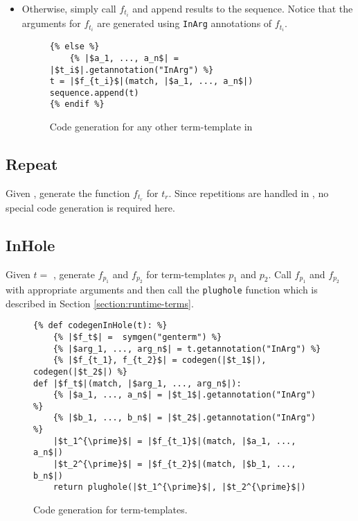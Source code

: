 \begin{itemize}
\item Otherwise, simply call $f_{t_i}$ and append results to the sequence. Notice that the arguments for $f_{t_i}$ are generated using \texttt{InArg} annotations of $f_{t_i}$.

\begin{figure}
\begin{verbatim}
{% else %}
	{% |$a_1, ..., a_n$| = |$t_i$|.getannotation("InArg") %}
t = |$f_{t_i}$|(match, |$a_1, ..., a_n$|)
sequence.append(t)
{% endif %}
\end{verbatim}
\caption{Code generation for any other term-template in \TermSequenceNoArg}
\label{codegen-term-sequence-anyother}
\end{figure}
\end{itemize}

\subsection{Repeat}
Given \TermRepeat, generate the function $f_{t_r}$ for $t_r$. Since repetitions are handled in \TermSequenceNoArg, no special code generation is required here.

\subsection{InHole}
Given $t=$ \TermInHole, generate $f_{p_1}$ and $f_{p_2}$ for term-templates $p_1$ and $p_2$. Call $f_{p_1}$ and $f_{p_2}$ with appropriate arguments and then call the \texttt{plughole} function which is described in Section \ref{section:runtime-terms}.

\begin{figure}[htb]
\begin{verbatim}
{% def codegenInHole(t): %}
	{% |$f_t$| =  symgen("genterm") %}
	{% |$arg_1, ..., arg_n$| = t.getannotation("InArg") %}
	{% |$f_{t_1}, f_{t_2}$| = codegen(|$t_1$|), codegen(|$t_2$|) %}
def |$f_t$|(match, |$arg_1, ..., arg_n$|):
	{% |$a_1, ..., a_n$| = |$t_1$|.getannotation("InArg") %}
	{% |$b_1, ..., b_n$| = |$t_2$|.getannotation("InArg") %}
	|$t_1^{\prime}$| = |$f_{t_1}$|(match, |$a_1, ..., a_n$|)
	|$t_2^{\prime}$| = |$f_{t_2}$|(match, |$b_1, ..., b_n$|)
	return plughole(|$t_1^{\prime}$|, |$t_2^{\prime}$|)
\end{verbatim}
\caption{Code generation for \PatternInHoleNoArg \space term-templates.}
\label{codegen-term-inhole}
\end{figure}


